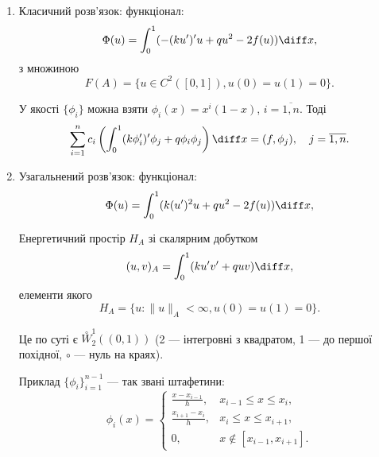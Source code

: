 \begin{solution}
    $\left.\right.$
    \begin{enumerate}
        \item Класичний розв'язок: функціонал:
        \begin{equation*}
            \Phi(u) = \int_0^1 (-(ku')' u + q u^2 - 2 f(u)) \diff x,
        \end{equation*}
        з множиною
        \begin{equation*}
            F(A) = \{ u \in C^2([0, 1]), u(0) = u(1) = 0\}.
        \end{equation*}

        У якості $\{\phi_i\}$ можна взяти $\phi_i(x) = x^i (1 - x)$, $i = \overline{1, n}$. Тоді
        \begin{equation*}
            \sum_{i = 1}^n c_i \left( \int_0^1 (k \phi_i')' \phi_j + q\phi_i \phi_j \right) \diff x = (f, \phi_j), \quad j = \overline{1, n}.
        \end{equation*}
        \item Узагальнений розв'язок: функціонал:
        \begin{equation*}
            \Phi(u) = \int_0^1 (k(u')^2 u + q u^2 - 2 f(u)) \diff x,
        \end{equation*}

        Енергетичний простір $H_A$ зі скалярним добутком
        \begin{equation}
            (u, v)_A = \int_0^1 (k u' v' + q u v) \diff x,
        \end{equation}
        елементи якого
        \begin{equation*}
            H_A = \{ u: \|u\|_A < \infty, u(0) = u(1) = 0\}.
        \end{equation*}

        Це по суті є $\overset{\circ}{W}_2^1((0, 1))$ (2 --- інтегровні з квадратом, 1 --- до першої похідної, $\circ$ --- нуль на краях). \medskip

        Приклад $\{\phi_i\}_{i = 1}^{n - 1}$ --- так звані штафетини:
        \begin{equation}
            \phi_i(x) = \begin{cases}
                \frac{x - x_{i - 1}}{h}, & x_{i - 1} \le x \le x_i, \\
                \frac{x_{i + 1} - x_i}{h}, & x_i \le x \le x_{i + 1}, \\
                0, & x \not\in [x_{i - 1}, x_{i + 1}].
            \end{cases}
        \end{equation}
    \end{enumerate}
\end{solution}

